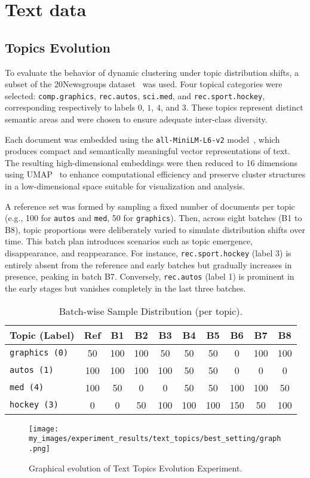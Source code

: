 \section{Text data}\label{sec:text_data}

\subsection{Topics Evolution}\label{subsec:topics_evolution}

To evaluate the behavior of dynamic clustering under topic distribution shifts,
a subset of the 20Newsgroups dataset~\cite{20newsgroups} was used. Four topical
categories were selected: \texttt{comp.graphics}, \texttt{rec.autos},
\texttt{sci.med}, and \texttt{rec.sport.hockey}, corresponding respectively to
labels $0$, $1$, $4$, and $3$. These topics represent distinct semantic areas
and were chosen to ensure adequate inter-class diversity.

Each document was embedded using the
\texttt{all\allowbreak-MiniLM\allowbreak-L6\allowbreak-v2}
model~\cite{sentence-transformers}, which produces compact and semantically
meaningful vector representations of text. The resulting high-dimensional
embeddings were then reduced to 16 dimensions using UMAP~\cite{umap} to enhance
computational efficiency and preserve cluster structures in a low-dimensional
space suitable for visualization and analysis.

A reference set was formed by sampling a fixed number of documents per topic
(e.g., 100 for \texttt{autos} and \texttt{med}, 50 for \texttt{graphics}).
Then, across eight batches (B1 to B8), topic proportions were deliberately
varied to simulate distribution shifts over time. This batch plan introduces
scenarios such as topic emergence, disappearance, and reappearance. For
instance, \texttt{rec.sport.hockey} (label 3) is entirely absent from the
reference and early batches but gradually increases in presence, peaking in
batch B7. Conversely, \texttt{rec.autos} (label 1) is prominent in the early
stages but vanishes completely in the last three batches.

\begin{table}[H]
      \centering
      \begin{tabular}{lccccccccc}
            \hline
            \textbf{Topic (Label)} & Ref & B1  & B2  & B3  & B4  & B5  & B6  & B7  & B8  \\
            \hline
            \texttt{graphics (0)}  & 50  & 100 & 100 & 50  & 50  & 50  & 0   & 100 & 100 \\
            \texttt{autos (1)}     & 100 & 100 & 100 & 100 & 50  & 50  & 0   & 0   & 0   \\
            \texttt{med (4)}       & 100 & 50  & 0   & 0   & 50  & 50  & 100 & 100 & 50  \\
            \texttt{hockey (3)}    & 0   & 0   & 50  & 100 & 100 & 100 & 150 & 50  & 100 \\
            \hline
      \end{tabular}
      \caption{Batch-wise Sample Distribution (per topic).}
\end{table}

\begin{figure}[H]
      \centering
      \texttt{[image: my\_images/experiment\_results/text\_topics/best\_setting/graph.png]}
      \caption{Graphical evolution of Text Topics Evolution Experiment.}
\end{figure}